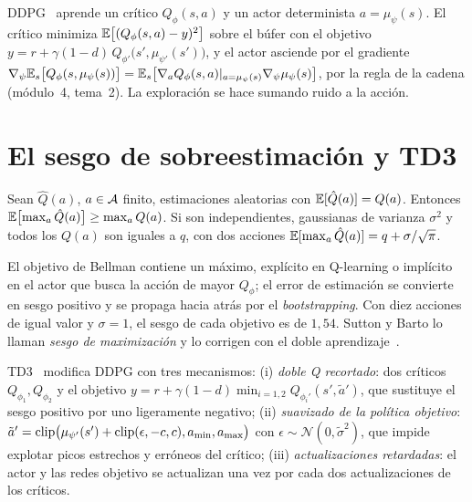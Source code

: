 \begin{definicion}[DDPG]\label{def:ddpg}
DDPG~\cite{ddpg} aprende un crítico $Q_\phi(s,a)$ y un actor determinista $a=\mu_\psi(s)$. El crítico minimiza $\mathbb{E}\bigl[(Q_\phi(s,a)-y)^{2}\bigr]$ sobre el búfer con el objetivo $y=r+\gamma(1-d)\,Q_{\phi'}\bigl(s',\mu_{\psi'}(s')\bigr)$, y el actor asciende por el gradiente $\nabla_\psi\mathbb{E}_s\bigl[Q_\phi(s,\mu_\psi(s))\bigr]=\mathbb{E}_s\bigl[\nabla_aQ_\phi(s,a)\rvert_{a=\mu_\psi(s)}\nabla_\psi\mu_\psi(s)\bigr]$, por la regla de la cadena (módulo~4, tema~2). La exploración se hace sumando ruido a la acción.
\end{definicion}

\section{El sesgo de sobreestimación y TD3}

\begin{proposicion}\label{prop:sobre}
Sean $\hat Q(a)$, $a\in\mathcal{A}$ finito, estimaciones aleatorias con $\mathbb{E}[\hat Q(a)]=Q(a)$. Entonces $\mathbb{E}\bigl[\max_a\hat Q(a)\bigr]\ge\max_aQ(a)$. Si son independientes, gaussianas de varianza $\sigma^{2}$ y todos los $Q(a)$ son iguales a $q$, con dos acciones $\mathbb{E}[\max_a\hat Q(a)]=q+\sigma/\sqrt\pi$.
\end{proposicion}

El objetivo de Bellman contiene un máximo, explícito en Q-learning o implícito en el actor que busca la acción de mayor $Q_\phi$; el error de estimación se convierte en sesgo positivo y se propaga hacia atrás por el \emph{bootstrapping}. Con diez acciones de igual valor y $\sigma=1$, el sesgo de cada objetivo es de $1{,}54$. Sutton y Barto lo llaman \emph{sesgo de maximización} y lo corrigen con el doble aprendizaje~\cite[§6.7]{sb}.

\begin{definicion}[TD3]\label{def:td3}
TD3~\cite{td3} modifica DDPG con tres mecanismos: (i) \emph{doble Q recortado}: dos críticos $Q_{\phi_1},Q_{\phi_2}$ y el objetivo $y=r+\gamma(1-d)\min_{i=1,2}Q_{\phi_i'}(s',\tilde a')$, que sustituye el sesgo positivo por uno ligeramente negativo; (ii) \emph{suavizado de la política objetivo}: $\tilde a'=\operatorname{clip}\bigl(\mu_{\psi'}(s')+\operatorname{clip}(\epsilon,-c,c),a_{\min},a_{\max}\bigr)$ con $\epsilon\sim\mathcal N(0,\tilde\sigma^{2})$, que impide explotar picos estrechos y erróneos del crítico; (iii) \emph{actualizaciones retardadas}: el actor y las redes objetivo se actualizan una vez por cada dos actualizaciones de los críticos.
\end{definicion}


